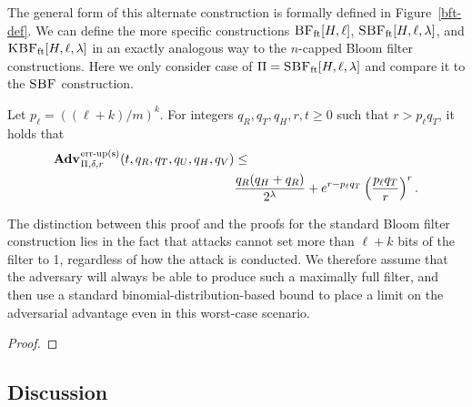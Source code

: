 The general form of this alternate construction is formally defined in
Figure~\ref{bft-def}. We can define the more specific constructions
$\textnormal{\textsc{BF}}_\mathrm{ft}[H,\ell]$, $\textnormal{\textsc{SBF}}_\mathrm{ft}[H,\ell,\lambda]$, and
$\textnormal{\textsc{KBF}}_\mathrm{ft}[H,\ell,\lambda]$ in an exactly analogous way to the $n$-capped
Bloom filter constructions. Here we only consider case of
$\Pi = \textnormal{\textsc{SBF}}_\mathrm{ft}[H,\ell,\lambda]$ and compare it to the $\textnormal{\textsc{SBF}}$
construction.

%

%
\begin{theorem}\label{thm:bf-thr-bound}
Let $p_\ell = ((\ell+k)/m)^k$. For integers $q_R, q_T, q_H, r, t \geq 0$ such
that $r > p_\ell q_T$, it holds that
  \begin{equation*}
    \begin{aligned}
      \Adv{\erreps}_{\Pi,\delta,r}(t, q_R,q_T,q_U,q_H,q_V) &\leq \\
        & \frac{q_R(q_H+q_R)}{2^\lambda} + e^{r-p_\ell q_T}\left(\frac{p_\ell q_T}{r}\right)^r.
    \end{aligned}
  \end{equation*}
\end{theorem}

The distinction between this proof and the proofs for the standard Bloom filter
construction lies in the fact that attacks cannot set more than
$\ell+k$ bits of the filter to 1, regardless of how the attack is conducted.
We therefore assume that the adversary will always be able to produce such a
maximally full filter, and then use a standard binomial-distribution-based bound
to place a limit on the adversarial advantage even in this worst-case scenario.

\begin{proof}
  
\end{proof}


\subsection{Discussion}


